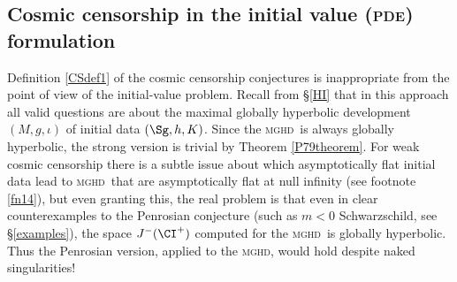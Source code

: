 \documentclass[12pt]{article}
\newcommand{\mghd}{\textsc{mghd}}
\newcommand{\pde}{\textsc{pde}}
\begin{document}
\subsection{Cosmic censorship in the initial value (\pde) formulation}\label{PDECCC}
Definition \ref{CSdef1} of the cosmic censorship conjectures is inappropriate from the point of view of the initial-value problem. 
Recall from \S\ref{HI}  that in this approach all valid questions are  about the maximal globally hyperbolic development $(M,g,\iota)$ of  initial data $(\Sg,h,K)$. Since the \mghd\ is always globally hyperbolic, the strong version is trivial by Theorem \ref{P79theorem}. For weak cosmic censorship there is a subtle issue about which asymptotically flat  initial data lead to 
\mghd\ that are  asymptotically flat at null infinity (see footnote \ref{fn14}), but even granting this, the real problem is that 
 even in clear counterexamples to the Penrosian conjecture (such as $m<0$ Schwarzschild, see \S\ref{examples}), the 
 space $J^-(\CI^+)$ computed for the \mghd\ is  globally hyperbolic. Thus the Penrosian version, applied to the \mghd, would 
 hold despite naked singularities!
\end{document}
